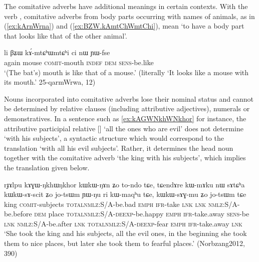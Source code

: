 The comitative adverbs have additional meanings in certain contexts. With the verb ,  comitative adverbs from body parts occurring with names of animals, as in (\ref{ex:kArnWrna}) and (\ref{ex:BZW.kAmtChWmtChi}), mean `to have a body part that looks like that of the other animal'.

\begin{exe}
\ex \label{ex:BZW.kAmtChWmtChi}
\gll
li βʑɯ kɤ́-mtɕʰɯ\redp{}mtɕʰi ci nɯ ɲɯ-fse  \\
again mouse \textsc{comit}-mouth \textsc{indef} \textsc{dem} \textsc{sens}-be.like \\
\glt `(The bat's) mouth is like that of a mouse.' (literally `It looks like a mouse with its mouth.' 25-qarmWrwa, 12)
\end{exe}

Nouns incorporated into comitative adverbs lose their nominal status and cannot be determined by relative clauses (including attributive adjectives), numerals or demonstratives. In a sentence such as \ref{ex:kAGWNkhWNkhor} for instance, the attributive participial relative [] `all the ones who are evil' does not determine  `with his subjects', a syntactic structure which would correspond to the translation `with all his evil subjects'. Rather, it determines the head noun together with the comitative adverb    `the king with his subjects', which implies the translation given below.

\begin{exe}
\ex \label{ex:kAGWNkhWNkhor}
\gll rɟɤlpu 	kɤɣɯ-ŋkhɯ\tld{}ŋkhor 	kɯ\tld{}kɯ-ŋɤn  	ʑo 	to-ndo 	tɕe, 	tɕendɤre 	kɯ-mɤku 	nɯ 	sɤtɕʰa 	kɯ\tld{}kɯ-sɤ-scit 	ʑo 	jo-tsɯm 	ɲɯ-ŋu 	ri 	kɯ-maqʰu 	tɕe, 	kɯ\tld{}kɯ-sɤɣ-mu 	ʑo 	jo-tsɯm 	tɕe \\
king \textsc{comit}-subjects \textsc{total}\tld{}\textsc{nmlz}:S/A-be.bad \textsc{emph} \textsc{ifr}-take \textsc{lnk}  \textsc{lnk} \textsc{nmlz}:S/A-be.before \textsc{dem} place \textsc{total}\tld{}\textsc{nmlz}:S/A-\textsc{deexp}-be.happy \textsc{emph} \textsc{ifr}-take.away \textsc{sens}-be \textsc{lnk} \textsc{nmlz}:S/A-be.after \textsc{lnk} \textsc{total}\tld{}\textsc{nmlz}:S/A-\textsc{deexp}-fear \textsc{emph} \textsc{ifr}-take.away \textsc{lnk} \\
\glt `She took the king and his subjects, all the evil ones, in the beginning she took them to nice places, but later she took them to fearful places.' (Norbzang2012, 390)
\end{exe}

